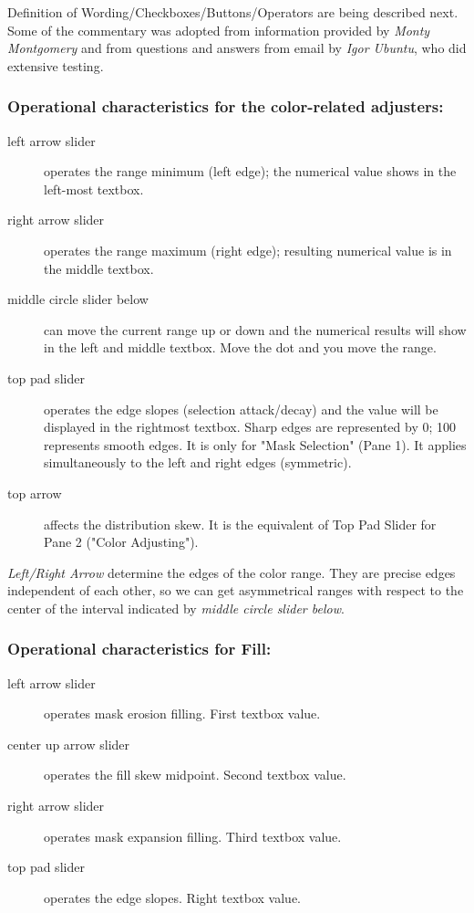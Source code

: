 Definition of Wording/Checkboxes/Buttons/Operators are being described next. Some of the commentary was adopted from information provided by \textit{Monty Montgomery} and from questions and answers from email by \textit{Igor Ubuntu}, who did extensive testing.

\subsubsection*{Operational characteristics for the color-related adjusters:}
\label{ssub:operational_characteristic_color}

\begin{description}
        \item[left arrow slider] operates the range minimum (left edge); the numerical value shows in the left-most textbox.
        \item[right arrow slider] operates the range maximum (right edge); resulting numerical value is in the middle textbox.
        \item[middle circle slider below] can move the current range up or down and the numerical results will show in the left and middle textbox. Move the dot and you move the range.
        \item[top pad slider] operates the edge slopes (selection attack/decay) and the value will be displayed in the rightmost textbox. Sharp edges are represented by 0; 100 represents smooth edges. It is only for "Mask Selection" (Pane 1). It applies simultaneously to the left and right edges (symmetric).
        \item[top arrow] affects the distribution skew. It is the equivalent of Top Pad Slider for Pane 2 ("Color Adjusting").
\end{description}

\textit{Left/Right Arrow} determine the edges of the color range. They are precise edges independent of each other, so we can get asymmetrical ranges with respect to the center of the interval indicated by \textit{middle circle slider below}.

\subsubsection*{Operational characteristics for Fill:}
\label{ssub:operational_characteristic_fill}

\begin{description}
        \item[left arrow slider] operates mask erosion filling. First textbox value.
        \item[center up arrow slider] operates the fill skew midpoint. Second textbox value.
        \item[right arrow slider] operates mask expansion filling. Third textbox value.
        \item[top pad slider] operates the edge slopes. Right textbox value.
\end{description}

